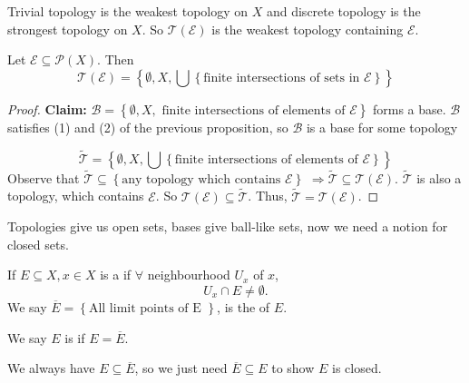 \begin{exmp}
    Trivial topology is the weakest topology on $X$ and discrete topology is the strongest topology 
    on $X$. So $\mathcal{T}(\mathcal{E})$ is the weakest topology containing $\mathcal{E}$.
\end{exmp}

\begin{prop}
    Let $\mathcal{E} \subseteq \mathcal{P}(X)$. Then 
    \[
        \mathcal{T}(\mathcal{E}) = \left\{ \emptyset, X, \bigcup \left\{ \text{
            finite intersections of sets in } \mathcal{E} \right\}  \right\} 
    \]  
\end{prop}
\begin{proof}
    \textbf{Claim:} $\mathcal{B} = \left\{ \emptyset, X, \text{ finite intersections of elements of } 
    \mathcal{E} \right\} $ forms a base.
    $\mathcal{B}$ satisfies (1) and (2) of the previous proposition, so $\mathcal{B}$ is a base for 
    some topology 

    \[
        \tilde{\mathcal{T}} = \left\{ \emptyset, X, \bigcup \left\{ \text{finite intersections of 
        elements of } \mathcal{E} \right\}  \right\} 
    \] 
    Observe that $\tilde{\mathcal{T}} \subseteq \left\{ \text{any topology which contains } \mathcal{E} 
    \right\} $ $\Rightarrow \tilde{\mathcal{T}} \subseteq \mathcal{T}(\mathcal{E})$. $\tilde{\mathcal{T}}$ 
    is also a topology, which contains $\mathcal{E}$. So $\mathcal{T}(\mathcal{E}) \subseteq 
    \tilde{\mathcal{T}}$. Thus, $\tilde{\mathcal{T}} = \mathcal{T}(\mathcal{E})$.   
\end{proof}

\begin{goal}
    Topologies give us open sets, bases give ball-like sets, now we need a notion for closed sets.
\end{goal}

\begin{defn}
    If $E \subseteq X, x \in X$ is a  if $\forall $ neighbourhood $U_x$ of $x$,
    \[
        U_x \cap E \neq \emptyset.
    \]
    We say $\overline{E} = \left\{  \text{All limit points of E } \right\} $, is the  
    of $E$.
    
    \noindent We say $E$ is  if $E = \overline{E}$.   
\end{defn}

\begin{rem}
    We always have $E \subseteq \overline{E}$, so we just need $\overline{E} \subseteq E$ to show
    $E$ is closed.  
\end{rem}


